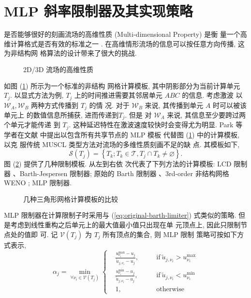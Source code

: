 
\section{MLP 斜率限制器及其实现策略}
\label{sec:improve-MLP-limiter}

是否能够很好的刻画流场的高维性质 (Multi-dimensional Property) 是衡
量一个高维计算格式是否有效的标准之一 \cite{Jameson1996,
  Park2010}. 在高维情形流场的信息可以按任意方向传播, 这为非结构网
格算法的设计带来了很大的挑战.
\begin{figure}[htbp]
  \centering
  
  \caption{2D/3D 流场的高维性质}
  \label{fig:multi-dimensional-property}
\end{figure}
如图 (\ref{fig:multi-dimensional-property}) 所示为一个标准的非结构
网格计算模板, 其中阴影部分为当前计算单元 $T_{j}$. 以显式方法为例,
$T_{j}$ 上的时间推进需要其邻居单元 $ABC$ 的信息. 考虑激波
以 $\mathcal{W}_{A}, \mathcal{W}_{B}$ 两种方式传播到 $T_{j}$ 的情
况. 对于 $\mathcal{W}_{B}$ 来说, 其传播到单元 $A$ 时可以被该单元上
的数值信息所捕获, 进而传递到$T_{j}$. 但是
对 $\mathcal{W}_{A}$ 来说, 其信息至少要跨过两个单元才能传递
到 $T_{j}$. 这种延迟特性在激波速度较快时会变得尤为明显.
Park 等学者在文献 \cite{Park2010} 中提出以包含所有共享节点的 MLP 模板
代替图 (\ref{fig:multi-dimensional-property}) 中的计算模板, 以克
服传统 MUSCL 类型方法对流场的多维性质刻画不足的缺
点. 其模板如下,
\begin{equation}
  \label{eq:MLP-stencil}
  \mathcal{S}(T_{j}) = \left\{ T_{k}; T_{k}\in \mathcal{T}, T_{j}
    \cap T_{k} \ne \varnothing \right\}.
\end{equation}
图 (\ref{fig:compare-stencil}) 提供了几种限制模板. 从左到右依
次代表了下列方法的计算模板: LCD 限制器 、Barth-Jespersen 限制器;
原始的 Barth 限制器 、3rd-order 非结构网格 WENO \cite{Hu1999};
MLP 限制器.
\begin{figure}[htbp]
  \centering
  
  \caption{几种三角形网格计算模板的比较}
  \label{fig:compare-stencil}
\end{figure}
MLP 限制器在计算限制子时采用与 (\ref{eq:original-barth-limiter})
式类似的策略. 但是考虑到线性重构之后单元上的最大值最小值只出现在单
元顶点上, 因此只限制节点处的值即
可. 记 $\mathcal{V}(T_{j})$ 为 $T_{j}$ 所有顶点的集合, 则 MLP 限制
策略可按如下方式表示,
\begin{equation}
  \label{eq:MLP-limiter}
  \alpha_{j} = \min_{\forall \nu_{i}\in \mathcal{V}(T_{j})}
  \left\{
    \begin{aligned}
      &\frac{u_{\nu_{i}}^{\max} -
        u_{j}}{\tilde{u}_{j,\nu_{i}} - u_{j}}, &\quad &\mbox{if}~
      \tilde{u}_{j,\nu_{i}} > u_{\nu_{i}}^{\max}\\
      &\frac{u_{\nu_{i}}^{\min} -
        u_{j}}{\tilde{u}_{j,\nu_{i}}- u_{j}}, &\quad
      &\mbox{if}~\tilde{u}_{j,\nu_{i}} < u_{\nu_{i}}^{\min}\\
      &1,  &\quad &\mbox{otherwise}
    \end{aligned}
  \right.
\end{equation}
